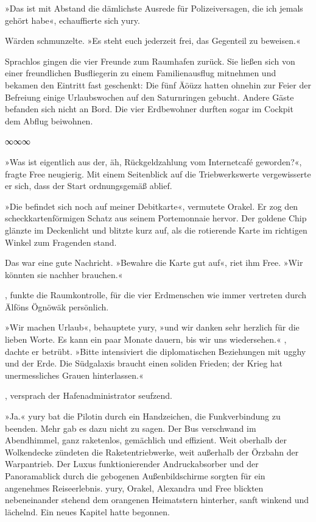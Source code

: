 »Das ist mit Abstand die dämlichste Ausrede für Polizeiversagen, die ich jemals gehört habe«, echauffierte sich yury.

Wärden schmunzelte. »Es steht euch jederzeit frei, das Gegenteil zu beweisen.«

Sprachlos gingen die vier Freunde zum Raumhafen zurück. Sie ließen sich von einer freundlichen Busfliegerin zu einem Familienausflug mitnehmen und bekamen den Eintritt fast geschenkt: Die fünf Äöüzz hatten ohnehin zur Feier der Befreiung einige Urlaubswochen auf den Saturnringen gebucht. Andere Gäste befanden sich nicht an Bord. Die vier Erdbewohner durften sogar im Cockpit dem Abflug beiwohnen.

\begin{center}
∞∞∞
\end{center}

»Was ist eigentlich aus der, äh, Rückgeldzahlung vom Internetcafé geworden?«, fragte Free neugierig. Mit einem Seitenblick auf die Triebwerkswerte vergewisserte er sich, dass der Start ordnungsgemäß ablief.

»Die befindet sich noch auf meiner Debitkarte«, vermutete Orakel. Er zog den scheckkartenförmigen Schatz aus seinem Portemonnaie hervor. Der goldene Chip glänzte im Deckenlicht und blitzte kurz auf, als die rotierende Karte im richtigen Winkel zum Fragenden stand.

Das war eine gute Nachricht. »Bewahre die Karte gut auf«, riet ihm Free. »Wir könnten sie nachher brauchen.«

, funkte die Raumkontrolle, für die vier Erdmenschen wie immer vertreten durch Älföns Ögnöwäk persönlich. 

»Wir machen Urlaub«, behauptete yury, »und wir danken sehr herzlich für die lieben Worte. Es kann ein paar Monate dauern, bis wir uns wiedersehen.« , dachte er betrübt. »Bitte intensiviert die diplomatischen Beziehungen mit ugghy und der Erde. Die Südgalaxis braucht einen soliden Frieden; der Krieg hat unermessliches Grauen hinterlassen.«

, versprach der Hafenadministrator seufzend. 

»Ja.« yury bat die Pilotin durch ein Handzeichen, die Funkverbindung zu beenden. Mehr gab es dazu nicht zu sagen. Der Bus verschwand im Abendhimmel, ganz raketenlos, gemächlich und effizient. Weit oberhalb der Wolkendecke zündeten die Raketentriebwerke, weit außerhalb der Örzbahn der Warpantrieb. Der Luxus funktionierender Andruckabsorber und der Panoramablick durch die gebogenen Außenbildschirme sorgten für ein angenehmes Reiseerlebnis. yury, Orakel, Alexandra und Free blickten nebeneinander stehend dem orangenen Heimatstern hinterher, sanft winkend und lächelnd. Ein neues Kapitel hatte begonnen.

